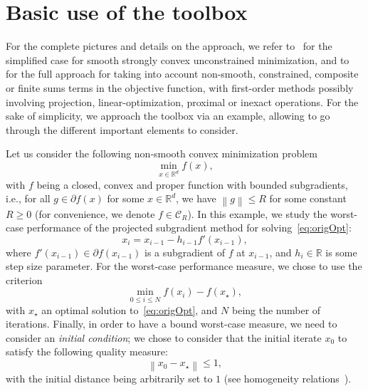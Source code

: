 \documentclass[11pt,a4paper]{article}
\newcommand{\norm}[1]{{\left\lVert#1\right\rVert}}
\newcommand{\Rd}{\mathbb{R}^d}
\newcommand{\real}{\mathbb{R}}
\begin{document}
\clearpage

\section{Basic use of the toolbox}	%
\label{sec:basicuse}

For the complete pictures and details on the approach, we refer to~\cite[Section 1\&3]{taylor2015smooth} for the simplified case for smooth strongly convex unconstrained minimization, and to~\cite[Section 1\&2]{taylor2015exact} for the full approach for taking into account non-smooth, constrained, composite or finite sums terms in the objective function, with first-order methods possibly involving projection, linear-optimization, proximal or inexact operations. For the sake of simplicity, we approach the toolbox via an example, allowing to go through the different important elements to consider.

Let us consider the following non-smooth convex minimization problem
\begin{equation}
\min_{x\in\Rd} f(x),\tag{OPT}\label{eq:origOpt}
\end{equation}
with $f$ being a closed, convex and proper function with bounded subgradients, i.e., for all $g\in\partial f(x)$ for some $x\in\Rd$, we have $\norm{g}\leq R$ for some constant $R\geq 0$ (for convenience, we denote $f\in \mathcal{C}_R$). 
In this example, we study the worst-case performance of the projected subgradient method for solving~\eqref{eq:origOpt}:
\begin{equation}
x_{i}=x_{i-1}-h_{i-1}f'(x_{i-1}),\label{eq:subgrad}
\end{equation}
where  $f'(x_{i-1})\in\partial f(x_{i-1})$ is a subgradient of $f$ at $x_{i-1}$, and $h_i\in\real$ is some step size parameter. For the worst-case performance measure, we chose to use the criterion \[\min_{0\leq i\leq N} f(x_i)-f(x_\star),\]
with $x_\star$ an optimal solution to~\eqref{eq:origOpt}, and $N$ being the number of iterations. Finally, in order to have a bound worst-case measure, we need to consider an \emph{initial condition}; we chose to consider that the initial iterate $x_0$ to satisfy the following quality measure:
\[ \norm{x_0-x_\star}\leq 1,\] with the initial distance being arbitrarily set to $1$ (see homogeneity relations~\cite[Section 3.5]{taylor2015smooth}).
\end{document}
